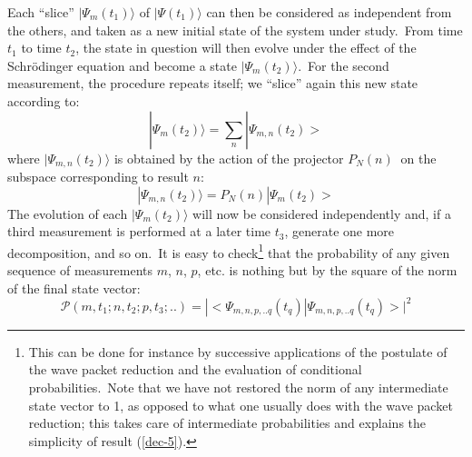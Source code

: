 \documentclass[12pt,onecolumn]{article}%
\begin{document}
Each ``slice'' $|\Psi_{m}(t_{1})\rangle$ of $|\Psi(t_{1})\rangle$ can then be
considered as independent from the others, and taken as a new initial state of
the system under study.\ From time $t_{1}$ to time $t_{2}$, the state in
question will then evolve under the effect of the Schr\"{o}dinger equation and
become a state $|\Psi_{m}(t_{2})\rangle$.\ For the second measurement, the
procedure repeats itself; we ``slice'' again this new state according to:%
\begin{equation}
|\Psi_{m}(t_{2})\rangle = \sum_{n}|\Psi_{m,n}(t_{2})> \label{dec-3}%
\end{equation}
where $|\Psi_{m,n}(t_{2})\rangle$ is obtained by the action of the projector
$P_{N}(n)$ $\ $on the subspace corresponding to result $n$:%
\begin{equation}
|\Psi_{m,n}(t_{2})\rangle = P_{N}(n)|\Psi_{m}(t_{2})> \label{dec-4}%
\end{equation}
The evolution of each $|\Psi_{m}(t_{2})\rangle$ will now be considered
independently and, if a third measurement is performed at a later time $t_{3}%
$, generate one more decomposition, and so on.\ It is easy to
check\footnote{This can be done for instance by successive applications of the
postulate of the wave packet reduction and the evaluation of conditional
probabilities.\ Note that we have not restored the norm of any intermediate
state vector to 1, as opposed to what one usually does with the wave packet
reduction; this takes care of intermediate probabilities and explains the
simplicity of result (\ref{dec-5}).} that the probability of any given
sequence of measurements $m$, $n$, $p$, etc. is nothing but by the square of
the norm of the final state vector:%
\begin{equation}
\mathcal{P}(m,t_{1};n,t_{2};p,t_{3};..)=|<\Psi_{m,n,p,..q}(t_{q})|
\Psi_{m,n,p,..q}(t_{q})>|^{2} \label{dec-5}%
\end{equation}
\end{document}
